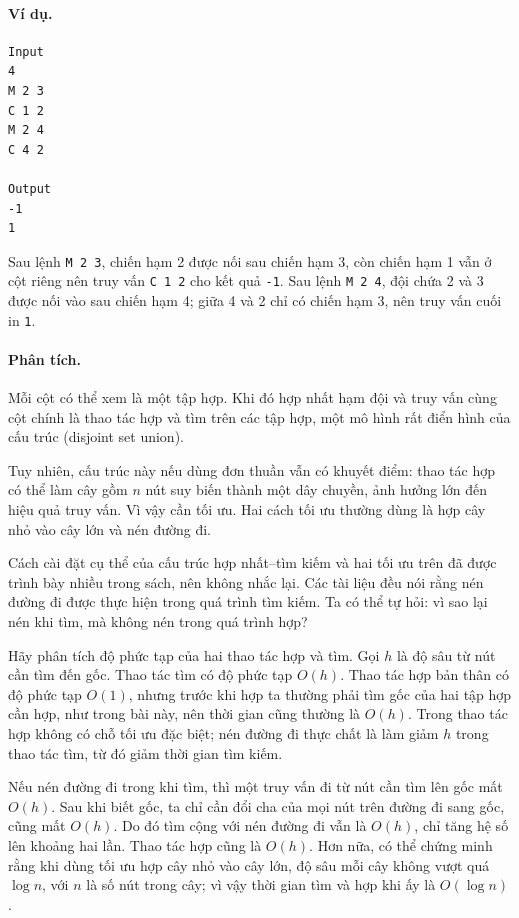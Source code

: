 \documentclass[11pt]{article}
\begin{document}
\paragraph{Ví dụ.}
\begin{verbatim}
Input
4
M 2 3
C 1 2
M 2 4
C 4 2

Output
-1
1
\end{verbatim}

Sau lệnh \texttt{M 2 3}, chiến hạm 2 được nối sau chiến hạm 3, còn chiến hạm
1 vẫn ở cột riêng nên truy vấn \texttt{C 1 2} cho kết quả \texttt{-1}. Sau
lệnh \texttt{M 2 4}, đội chứa 2 và 3 được nối vào sau chiến hạm 4; giữa 4 và
2 chỉ có chiến hạm 3, nên truy vấn cuối in \texttt{1}.

\paragraph{Phân tích.}
Mỗi cột có thể xem là một tập hợp. Khi đó hợp nhất hạm đội và truy vấn cùng
cột chính là thao tác hợp và tìm trên các tập hợp, một mô hình rất điển hình
của cấu trúc  (disjoint set union).

Tuy nhiên, cấu trúc này nếu dùng đơn thuần vẫn có khuyết điểm: thao tác hợp
có thể làm cây gồm $n$ nút suy biến thành một dây chuyền, ảnh hưởng lớn đến
hiệu quả truy vấn. Vì vậy cần tối ưu. Hai cách tối ưu thường dùng là hợp cây
nhỏ vào cây lớn và nén đường đi.

Cách cài đặt cụ thể của cấu trúc hợp nhất--tìm kiếm và hai tối ưu trên đã
được trình bày nhiều trong sách, nên không nhắc lại. Các tài liệu đều nói
rằng nén đường đi được thực hiện trong quá trình tìm kiếm. Ta có thể tự hỏi:
vì sao lại nén khi tìm, mà không nén trong quá trình hợp?

Hãy phân tích độ phức tạp của hai thao tác hợp và tìm. Gọi $h$ là độ sâu từ
nút cần tìm đến gốc. Thao tác tìm có độ phức tạp $O(h)$. Thao tác hợp bản
thân có độ phức tạp $O(1)$, nhưng trước khi hợp ta thường phải tìm gốc của
hai tập hợp cần hợp, như trong bài này, nên thời gian cũng thường là $O(h)$.
Trong thao tác hợp không có chỗ tối ưu đặc biệt; nén đường đi thực chất là
làm giảm $h$ trong thao tác tìm, từ đó giảm thời gian tìm kiếm.

Nếu nén đường đi trong khi tìm, thì một truy vấn đi từ nút cần tìm lên gốc
mất $O(h)$. Sau khi biết gốc, ta chỉ cần đổi cha của mọi nút trên đường đi
sang gốc, cũng mất $O(h)$. Do đó tìm cộng với nén đường đi vẫn là $O(h)$,
chỉ tăng hệ số lên khoảng hai lần. Thao tác hợp cũng là $O(h)$. Hơn nữa, có
thể chứng minh rằng khi dùng tối ưu hợp cây nhỏ vào cây lớn, độ sâu mỗi cây
không vượt quá $\log n$, với $n$ là số nút trong cây; vì vậy thời gian tìm và
hợp khi ấy là $O(\log n)$.
\end{document}
